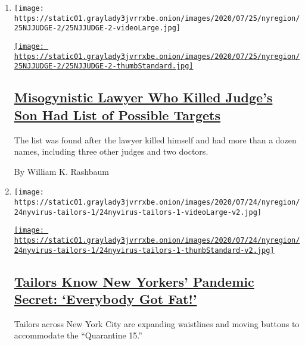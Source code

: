 \begin{enumerate}
\def\labelenumi{\arabic{enumi}.}
\item
  \texttt{[image: https://static01.graylady3jvrrxbe.onion/images/2020/07/25/nyregion/25NJJUDGE-2/25NJJUDGE-2-videoLarge.jpg]}

  \href{/2020/07/25/nyregion/roy-den-hollander-esther-salas-list.html}{\texttt{[image: https://static01.graylady3jvrrxbe.onion/images/2020/07/25/nyregion/25NJJUDGE-2/25NJJUDGE-2-thumbStandard.jpg]}}

  \hypertarget{misogynistic-lawyer-who-killed-judges-son-had-list-of-possible-targets}{%
  \subsection{\texorpdfstring{\href{/2020/07/25/nyregion/roy-den-hollander-esther-salas-list.html}{Misogynistic
  Lawyer Who Killed Judge's Son Had List of Possible
  Targets}}{Misogynistic Lawyer Who Killed Judge's Son Had List of Possible Targets}}\label{misogynistic-lawyer-who-killed-judges-son-had-list-of-possible-targets}}

  The list was found after the lawyer killed himself and had more than a
  dozen names, including three other judges and two doctors.

  By William K. Rashbaum
\item
  \texttt{[image: https://static01.graylady3jvrrxbe.onion/images/2020/07/24/nyregion/24nyvirus-tailors-1/24nyvirus-tailors-1-videoLarge-v2.jpg]}

  \href{/2020/07/25/nyregion/coronavirus-tailors-cleaners-weight-gain.html}{\texttt{[image: https://static01.graylady3jvrrxbe.onion/images/2020/07/24/nyregion/24nyvirus-tailors-1/24nyvirus-tailors-1-thumbStandard-v2.jpg]}}

  \hypertarget{tailors-know-new-yorkers-pandemic-secret-everybody-got-fat}{%
  \subsection{\texorpdfstring{\href{/2020/07/25/nyregion/coronavirus-tailors-cleaners-weight-gain.html}{Tailors
  Know New Yorkers' Pandemic Secret: `Everybody Got
  Fat!'}}{Tailors Know New Yorkers' Pandemic Secret: `Everybody Got Fat!'}}\label{tailors-know-new-yorkers-pandemic-secret-everybody-got-fat}}

  Tailors across New York City are expanding waistlines and moving
  buttons to accommodate the ``Quarantine 15.''


\end{enumerate}
